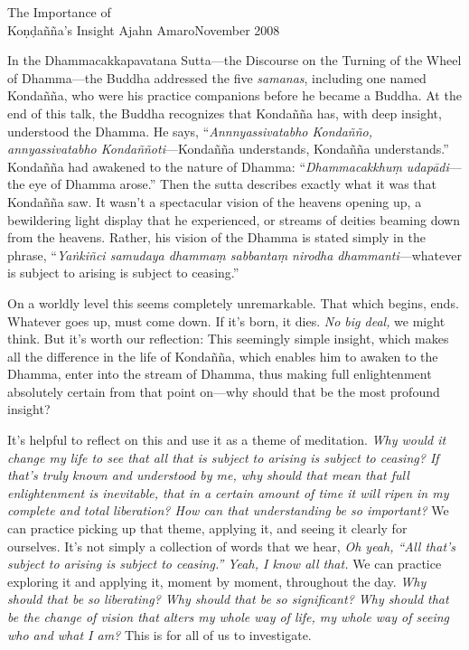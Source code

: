 {The Importance of\\Koṇḍañña's Insight}
{Ajahn Amaro}{November 2008}

In the Dhammacakkapavatana Sutta---the Discourse on the Turning of the 
Wheel of Dhamma---the Buddha addressed the five \emph{samanas}, 
including one named Kondañña, who were his practice companions before 
he became a Buddha. At the end of this talk, the Buddha recognizes that 
Kondañña has, with deep insight, understood the Dhamma. He says, 
``\emph{Annnyassivatabho Kondañño, annyassivatabho 
Kondaññoti}---Kondañña understands, Kondañña understands.'' 
Kondañña had awakened to the nature of Dhamma: 
``\emph{Dhammacakkhuṃ udapādi}---the eye of Dhamma arose.'' Then the 
sutta describes exactly what it was that Kondañña saw. It wasn't a 
spectacular vision of the heavens opening up, a bewildering light 
display that he experienced, or streams of deities beaming down from 
the heavens. Rather, his vision of the Dhamma is stated simply in the 
phrase, ``\emph{Yaṅkiñci samudaya dhammaṃ sabbantaṃ nirodha 
dhammanti}---whatever is subject to arising is subject to ceasing.''

On a worldly level this seems completely unremarkable. That which 
begins, ends. Whatever goes up, must come down. If it's born, it dies. 
\emph{No big deal,} we might think. But it's worth our reflection: This 
seemingly simple insight, which makes all the difference in the life of 
Kondañña, which enables him to awaken to the Dhamma, enter into the 
stream of Dhamma, thus making full enlightenment absolutely certain 
from that point on---why should that be the most profound insight?

It's helpful to reflect on this and use it as a theme of meditation. 
\emph{Why would it change my life to see that all that is subject to 
arising is subject to ceasing? If that's truly known and understood by 
me, why should that mean that full enlightenment is inevitable, that in 
a certain amount of time it will ripen in my complete and total 
liberation? How can that understanding be so important?} We can 
practice picking up that theme, applying it, and seeing it clearly for 
ourselves. It's not simply a collection of words that we hear, \emph{Oh 
yeah, ``All that's subject to arising is subject to ceasing.'' Yeah, I 
know all that.} We can practice exploring it and applying it, moment by 
moment, throughout the day. \emph{Why should that be so liberating? Why 
should that be so significant? Why should that be the change of vision 
that alters my whole way of life, my whole way of seeing who and what I 
am?} This is for all of us to investigate.

